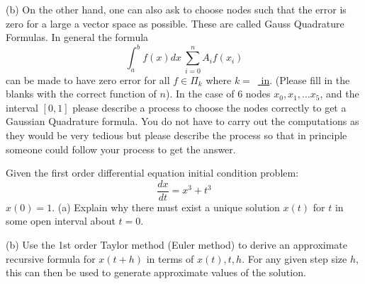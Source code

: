 \documentclass[12pt]{article}
\begin{document}
\vspace{3 in}

\noindent
(b) On the other hand, one can also ask to choose nodes such that the error is zero for a large a vector space as possible. These are called 
Gauss Quadrature Formulas. In general the formula 
$$
\int_a^b f(x) dx ~ \sum_{i=0}^n A_i f(x_i)
$$
can be made to have zero error for all $f \in \Pi_k$ where $k=$~\underline{ in}. (Please fill in the blanks with the correct function of $n$).
In the case of $6$ nodes $x_0, x_1, \dots x_5$, and the interval $[0,1]$ please describe a process to choose the nodes correctly to get a 
Gaussian Quadrature formula. You do not have to carry out the computations as they would be very tedious but please describe the process so 
that in principle someone could follow your process to get the answer.

\newpage

Given the first order differential equation initial condition problem:
$$
\frac{dx}{dt} = x^3+t^3
$$
$x(0)=1$.
(a) Explain why there must exist a unique solution $x(t)$ for $t$ in some open interval about $t=0$. 

\vspace{2 in}

\noindent
(b) Use the 1st order Taylor method (Euler method) to derive an approximate recursive formula for 
$x(t+h)$ in terms of $x(t),t,h$. For any given step size $h$, this can then be used to generate approximate values of the solution.


\problemsdone
\end{document}
